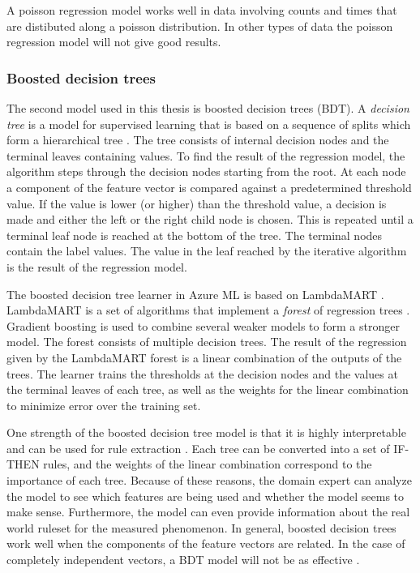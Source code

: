
A poisson regression model works well in data involving counts and times that are distibuted along a poisson distribution. 
In other types of data the poisson regression model will not give good results.

\subsubsection{Boosted decision trees}

The second model used in this thesis is boosted decision trees (BDT).
A \textit{decision tree} is a model for supervised learning that is based on a sequence of splits which form a hierarchical tree \cite{alpaydin}.
The tree consists of internal decision nodes and the terminal leaves containing values.
To find the result of the regression model, the algorithm steps through the decision nodes starting from the root.
At each node a component of the feature vector is compared against a predetermined threshold value.
If the value is lower (or higher) than the threshold value, a decision is made and either the left or the right child node is chosen.
This is repeated until a terminal leaf node is reached at the bottom of the tree. 
The terminal nodes contain the label values.
The value in the leaf reached by the iterative algorithm is the result of the regression model.

The boosted decision tree learner in Azure ML is based on LambdaMART \cite{azurebdt}.
LambdaMART is a set of algorithms that implement a \textit{forest} of regression trees \cite{lambdamart2010}.
Gradient boosting \cite{friedman2001greedy} is used to combine several weaker models to form a stronger model.
The forest consists of multiple decision trees.
The result of the regression given by the LambdaMART forest is a linear combination of the outputs of the trees.
The learner trains the thresholds at the decision nodes and the values at the terminal leaves of each tree, as well as the weights for the linear combination to minimize error over the training set.


One strength of the boosted decision tree model is that it is highly interpretable and can be used for rule extraction \cite{alpaydin}. Each tree can be converted into a set of IF-THEN rules, and the weights of the linear combination correspond to the importance of each tree. 
Because of these reasons, the domain expert can analyze the model to see which features are being used and whether the model seems to make sense.
Furthermore, the model can even provide information about the real world ruleset for the measured phenomenon.
In general, boosted decision trees work well when the components of the feature vectors are related. In the case of completely independent vectors, a BDT model will not be as effective \cite{azurebdt}.

